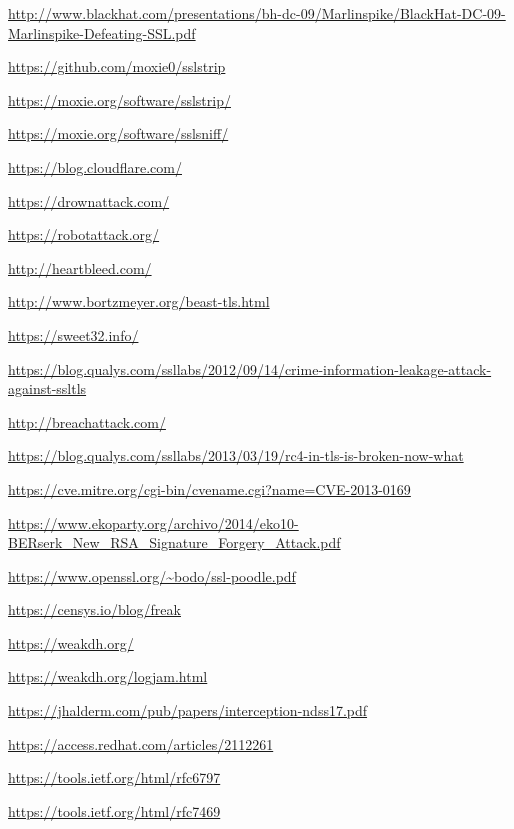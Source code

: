 \begin{thebibliography}{4}

  \url{http://www.blackhat.com/presentations/bh-dc-09/Marlinspike/BlackHat-DC-09-Marlinspike-Defeating-SSL.pdf}

  \url{https://github.com/moxie0/sslstrip}

  \url{https://moxie.org/software/sslstrip/}

  \url{https://moxie.org/software/sslsniff/}

  \url{https://blog.cloudflare.com/}

  \url{https://drownattack.com/}

  \url{https://robotattack.org/}

  \url{http://heartbleed.com/}

  \url{http://www.bortzmeyer.org/beast-tls.html}

  \url{https://sweet32.info/}

  \url{https://blog.qualys.com/ssllabs/2012/09/14/crime-information-leakage-attack-against-ssltls}

  \url{http://breachattack.com/}

  \url{https://blog.qualys.com/ssllabs/2013/03/19/rc4-in-tls-is-broken-now-what}

  \url{https://cve.mitre.org/cgi-bin/cvename.cgi?name=CVE-2013-0169}

  \url{https://www.ekoparty.org/archivo/2014/eko10-BERserk_New_RSA_Signature_Forgery_Attack.pdf}

  \url{https://www.openssl.org/~bodo/ssl-poodle.pdf}

  \url{https://censys.io/blog/freak}

  \url{https://weakdh.org/}

  \url{https://weakdh.org/logjam.html}

  \url{https://jhalderm.com/pub/papers/interception-ndss17.pdf}

  \url{https://access.redhat.com/articles/2112261}

  \url{https://tools.ietf.org/html/rfc6797}

  \url{https://tools.ietf.org/html/rfc7469}

\end{thebibliography}
